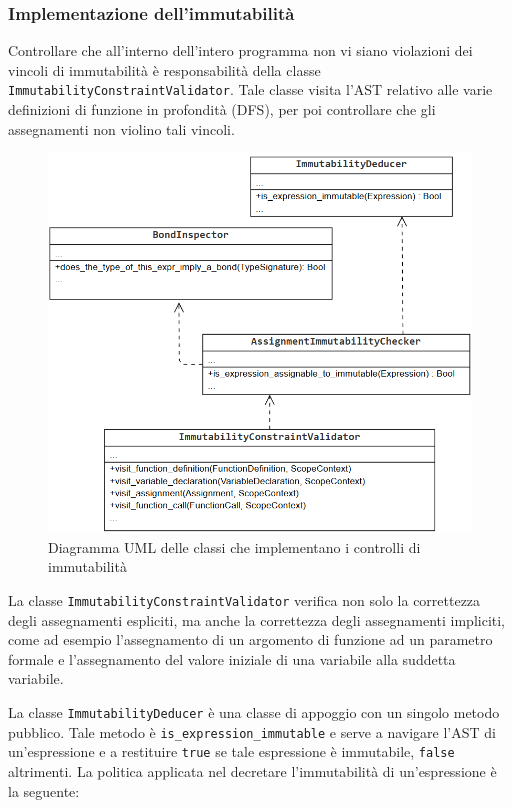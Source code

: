 \subsubsection{Implementazione dell'immutabilità}
Controllare che all'interno dell'intero programma non vi siano violazioni dei vincoli di 
immutabilità è responsabilità della classe \texttt{ImmutabilityConstraintValidator}. Tale 
classe visita l'AST relativo alle varie definizioni di funzione in profondità (DFS), per poi 
controllare che gli assegnamenti non violino tali vincoli. \\

\begin{figure}[H]
    \centering
        \includegraphics[scale=0.7]{../../Assets/ImmutabilityUML.png}
    \caption{Diagramma UML delle classi che implementano i controlli di immutabilità}
\end{figure}


La classe \texttt{ImmutabilityConstraintValidator} verifica non solo la correttezza degli assegnamenti 
espliciti, ma anche la correttezza degli assegnamenti impliciti, come ad esempio l'assegnamento di un 
argomento di funzione ad un parametro formale e l'assegnamento del valore iniziale di una variabile alla 
suddetta variabile. \\

\newpage

La classe \texttt{ImmutabilityDeducer} è una classe di appoggio con un singolo metodo pubblico. Tale metodo è 
\texttt{is\_expression\_immutable} e serve a navigare l'AST di un'espressione e a restituire \texttt{true} se
tale espressione è immutabile, \texttt{false} altrimenti. La politica applicata nel decretare l'immutabilità
di un'espressione è la seguente:

